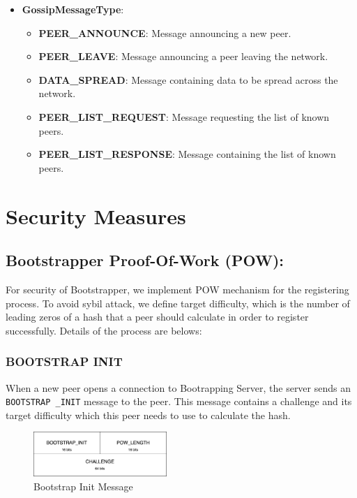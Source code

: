 \begin{itemize}
    \item \textbf{GossipMessageType}:
      
        \begin{itemize}
            \item \textbf{PEER\_ANNOUNCE}: Message announcing a new peer.
            \item \textbf{PEER\_LEAVE}: Message announcing a peer leaving the network.
            \item \textbf{DATA\_SPREAD}: Message containing data to be spread across the network.
            \item \textbf{PEER\_LIST\_REQUEST}: Message requesting the list of known peers.
            \item \textbf{PEER\_LIST\_RESPONSE}: Message containing the list of known peers.
        \end{itemize}
\end{itemize}

\section{Security Measures}

\subsection{Bootstrapper Proof-Of-Work (POW):}

For security of Bootstrapper, we implement POW mechanism for the registering process. To avoid sybil attack, we define target difficulty, which is the number of leading zeros of a hash that a peer should calculate in order to register successfully. Details of the process are belows:

\subsubsection{BOOTSTRAP INIT}

When a new peer opens a connection to Bootrapping Server, the server sends an \texttt{BOOTSTRAP \_INIT} message to the peer. This message contains a challenge and its target difficulty which this peer needs to use to calculate the hash.

\begin{figure}[H]
    \centering
    \includegraphics[width=0.45\textwidth]{pics/bootstrap.init.png}
    \caption{Bootstrap Init Message}
\end{figure}

